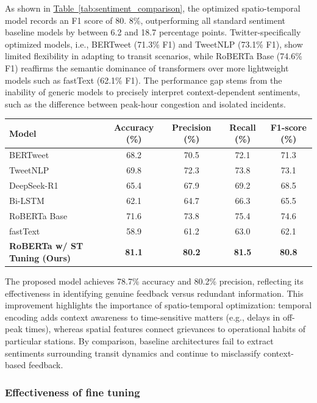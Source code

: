 \documentclass[a4paper,fleqn,12pt]{cas-sc}
\begin{document}
As shown in \hyperref[tab:sentiment_comparison]{Table~\ref{tab:sentiment_comparison}}, the optimized spatio-temporal model records an F1 score of 80. 8\%, outperforming all standard sentiment baseline models by between 6.2 and 18.7 percentage points. Twitter-specifically optimized models, i.e., BERTweet (71.3\% F1) and TweetNLP (73.1\% F1), show limited flexibility in adapting to transit scenarios, while RoBERTa Base (74.6\% F1) reaffirms the semantic dominance of transformers over more lightweight models such as fastText (62.1\% F1). The performance gap stems from the inability of generic models to precisely interpret context-dependent sentiments, such as the difference between peak-hour congestion and isolated incidents.


\begin{center}
\label{tab:sentiment_comparison}  
\begin{tabular}{lcccc}  
\toprule  
Model & Accuracy (\%) & Precision (\%) & Recall (\%) & F1-score (\%) \\
\midrule  
BERTweet & 68.2 & 70.5 & 72.1 & 71.3 \\
TweetNLP  & 69.8 & 72.3 & 73.8 & 73.1 \\
DeepSeek-R1 & 65.4 & 67.9 & 69.2 & 68.5 \\
Bi-LSTM  & 62.1 & 64.7 & 66.3 & 65.5 \\
RoBERTa Base  & 71.6 & 73.8 & 75.4 & 74.6 \\
fastText  & 58.9 & 61.2 & 63.0 & 62.1 \\
\textbf{RoBERTa w/ ST Tuning (Ours)} & \textbf{81.1} & \textbf{80.2} & \textbf{81.5} & \textbf{80.8} \\
\bottomrule  
\end{tabular}  
\end{center}

The proposed model achieves 78.7\% accuracy and 80.2\% precision, reflecting its effectiveness in identifying genuine feedback versus redundant information. This improvement highlights the importance of spatio-temporal optimization: temporal encoding adds context awareness to time-sensitive matters (e.g., delays in off-peak times), whereas spatial features connect grievances to operational habits of particular stations. By comparison, baseline architectures fail to extract sentiments surrounding transit dynamics and continue to misclassify context-based feedback.

\subsubsection{Effectiveness of fine tuning}
\end{document}
